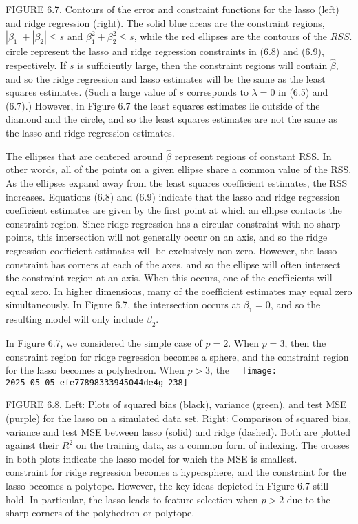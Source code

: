\documentclass[10pt]{article}
\begin{document}
FIGURE 6.7. Contours of the error and constraint functions for the lasso (left) and ridge regression (right). The solid blue areas are the constraint regions, $\left|\beta_{1}\right|+\left|\beta_{2}\right| \leq s$ and $\beta_{1}^{2}+\beta_{2}^{2} \leq s$, while the red ellipses are the contours of the $R S S$.\\
circle represent the lasso and ridge regression constraints in (6.8) and (6.9), respectively. If $s$ is sufficiently large, then the constraint regions will contain $\hat{\beta}$, and so the ridge regression and lasso estimates will be the same as the least squares estimates. (Such a large value of $s$ corresponds to $\lambda=0$ in (6.5) and (6.7).) However, in Figure 6.7 the least squares estimates lie outside of the diamond and the circle, and so the least squares estimates are not the same as the lasso and ridge regression estimates.

The ellipses that are centered around $\hat{\beta}$ represent regions of constant RSS. In other words, all of the points on a given ellipse share a common value of the RSS. As the ellipses expand away from the least squares coefficient estimates, the RSS increases. Equations (6.8) and (6.9) indicate that the lasso and ridge regression coefficient estimates are given by the first point at which an ellipse contacts the constraint region. Since ridge regression has a circular constraint with no sharp points, this intersection will not generally occur on an axis, and so the ridge regression coefficient estimates will be exclusively non-zero. However, the lasso constraint has corners at each of the axes, and so the ellipse will often intersect the constraint region at an axis. When this occurs, one of the coefficients will equal zero. In higher dimensions, many of the coefficient estimates may equal zero simultaneously. In Figure 6.7, the intersection occurs at $\beta_{1}=0$, and so the resulting model will only include $\beta_{2}$.

In Figure 6.7, we considered the simple case of $p=2$. When $p=3$, then the constraint region for ridge regression becomes a sphere, and the constraint region for the lasso becomes a polyhedron. When $p>3$, the\
\
\texttt{[image: 2025\_05\_05\_efe77898333945044de4g-238]}

FIGURE 6.8. Left: Plots of squared bias (black), variance (green), and test MSE (purple) for the lasso on a simulated data set. Right: Comparison of squared bias, variance and test MSE between lasso (solid) and ridge (dashed). Both are plotted against their $R^{2}$ on the training data, as a common form of indexing. The crosses in both plots indicate the lasso model for which the MSE is smallest.\\
constraint for ridge regression becomes a hypersphere, and the constraint for the lasso becomes a polytope. However, the key ideas depicted in Figure 6.7 still hold. In particular, the lasso leads to feature selection when $p>2$ due to the sharp corners of the polyhedron or polytope.
\end{document}
